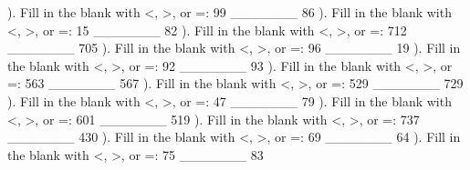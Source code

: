 \documentclass{article}%
\begin{document}
\newline%
\newline%
). Fill in the blank with <, >, or =: 99 \_\_\_\_\_\_\_ 86%
\newline%
\newline%
). Fill in the blank with <, >, or =: 15 \_\_\_\_\_\_\_ 82%
\newline%
\newline%
). Fill in the blank with <, >, or =: 712 \_\_\_\_\_\_\_ 705%
\newline%
\newline%
). Fill in the blank with <, >, or =: 96 \_\_\_\_\_\_\_ 19%
\newline%
\newline%
). Fill in the blank with <, >, or =: 92 \_\_\_\_\_\_\_ 93%
\newline%
\newline%
). Fill in the blank with <, >, or =: 563 \_\_\_\_\_\_\_ 567%
\newline%
\newline%
). Fill in the blank with <, >, or =: 529 \_\_\_\_\_\_\_ 729%
\newline%
\newline%
). Fill in the blank with <, >, or =: 47 \_\_\_\_\_\_\_ 79%
\newline%
\newline%
). Fill in the blank with <, >, or =: 601 \_\_\_\_\_\_\_ 519%
\newline%
\newline%
). Fill in the blank with <, >, or =: 737 \_\_\_\_\_\_\_ 430%
\newline%
\newline%
). Fill in the blank with <, >, or =: 69 \_\_\_\_\_\_\_ 64%
\newline%
\newline%
). Fill in the blank with <, >, or =: 75 \_\_\_\_\_\_\_ 83%
\newline%
\end{document}
